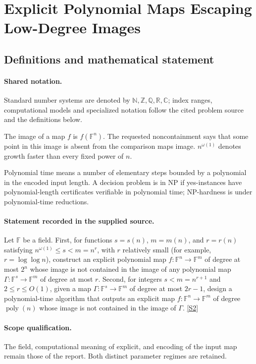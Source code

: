 \documentclass[11pt]{article}
\newcommand{\sref}[2]{\hyperlink{source:#1:#2}{[S#2]}}
\begin{document}
\section{Explicit Polynomial Maps Escaping Low-Degree Images}\label{statement}

\subsection{Definitions and mathematical statement}

\paragraph{Shared notation.}Standard number systems are denoted by $\mathbb N,\mathbb Z,\mathbb Q,\mathbb R,\mathbb C$; index ranges, computational models and specialized notation follow the cited problem source and the definitions below.


The image of a map $f$ is $f(\mathbb F^n)$. The requested noncontainment says that some point in this image is absent from the comparison map\textquotesingle s image. $n^{\omega(1)}$ denotes growth faster than every fixed power of $n$.

Polynomial time means a number of elementary steps bounded by a polynomial in the encoded input length. A decision problem is in $\mathrm{NP}$ if yes-instances have polynomial-length certificates verifiable in polynomial time; NP-hardness is under polynomial-time reductions.
\paragraph{Statement recorded in the supplied source.}
Let $\mathbb{F}$ be a field. First, for functions $s=s(n)$, $m=m(n)$, and $r=r(n)$ satisfying $n^{\omega(1)}\leq s<m=n^r$, with $r$ relatively small (for example, $r=\log\log n$), construct an explicit polynomial map $f:\mathbb{F}^n\to\mathbb{F}^m$ of degree at most $2^n$ whose image is not contained in the image of any polynomial map $\Gamma:\mathbb{F}^s\to\mathbb{F}^m$ of degree at most $r$. Second, for integers $s<m=n^{r+1}$ and $2\leq r\leq O(1)$, given a map $\Gamma:\mathbb{F}^s\to\mathbb{F}^m$ of degree at most $2r-1$, design a polynomial-time algorithm that outputs an explicit map $f:\mathbb{F}^n\to\mathbb{F}^m$ of degree $\operatorname{poly}(n)$ whose image is not contained in the image of $\Gamma$. \sref{statement}{2}
\paragraph{Scope qualification.}
The field, computational meaning of explicit, and encoding of the input map remain those of the report. Both distinct parameter regimes are retained.
\end{document}
